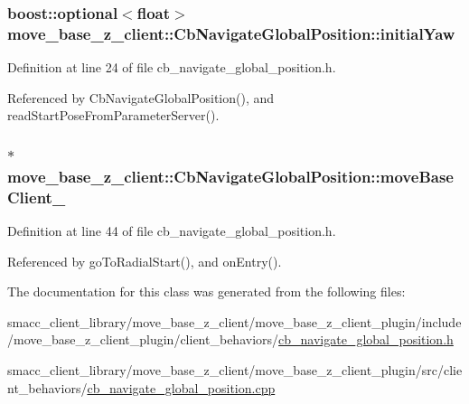 \subsubsection[{\texorpdfstring{initial\+Yaw}{initialYaw}}]{\setlength{\rightskip}{0pt plus 5cm}boost\+::optional$<$float$>$ move\+\_\+base\+\_\+z\+\_\+client\+::\+Cb\+Navigate\+Global\+Position\+::initial\+Yaw}\hypertarget{classmove__base__z__client_1_1CbNavigateGlobalPosition_a339ec9b992e2565f404d8a2fa8a5be87}{}\label{classmove__base__z__client_1_1CbNavigateGlobalPosition_a339ec9b992e2565f404d8a2fa8a5be87}


Definition at line 24 of file cb\+\_\+navigate\+\_\+global\+\_\+position.\+h.



Referenced by Cb\+Navigate\+Global\+Position(), and read\+Start\+Pose\+From\+Parameter\+Server().

\subsubsection[{\texorpdfstring{move\+Base\+Client\+\_\+}{moveBaseClient_}}]{$\ast$ move\+\_\+base\+\_\+z\+\_\+client\+::\+Cb\+Navigate\+Global\+Position\+::move\+Base\+Client\+\_\+\hspace{0.3cm}{\ttfamily [private]}}\hypertarget{classmove__base__z__client_1_1CbNavigateGlobalPosition_a418cb1a461d6f28cb34908b739298657}{}\label{classmove__base__z__client_1_1CbNavigateGlobalPosition_a418cb1a461d6f28cb34908b739298657}


Definition at line 44 of file cb\+\_\+navigate\+\_\+global\+\_\+position.\+h.



Referenced by go\+To\+Radial\+Start(), and on\+Entry().



The documentation for this class was generated from the following files\+:\begin{DoxyCompactItemize}
\item 
smacc\+\_\+client\+\_\+library/move\+\_\+base\+\_\+z\+\_\+client/move\+\_\+base\+\_\+z\+\_\+client\+\_\+plugin/include/move\+\_\+base\+\_\+z\+\_\+client\+\_\+plugin/client\+\_\+behaviors/\hyperlink{cb__navigate__global__position_8h}{cb\+\_\+navigate\+\_\+global\+\_\+position.\+h}\item 
smacc\+\_\+client\+\_\+library/move\+\_\+base\+\_\+z\+\_\+client/move\+\_\+base\+\_\+z\+\_\+client\+\_\+plugin/src/client\+\_\+behaviors/\hyperlink{cb__navigate__global__position_8cpp}{cb\+\_\+navigate\+\_\+global\+\_\+position.\+cpp}\end{DoxyCompactItemize}
